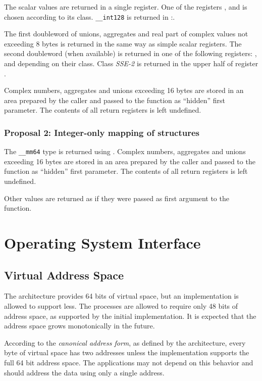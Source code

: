 The scalar values are returned in a single register. One of the
registers \RAX,  and  is chosen according to its
class.  \verb|__int128| is returned in \RDX:\RAX.

The first doubleword of unions, aggregates and real part of complex values
not exceeding 8 bytes is returned in the same way as simple scalar
registers.  The second doubleword (when available) is returned in one of
the following registers: \RAX,  and  depending on
their class.  Class \emph{SSE-2} is returned in the upper half of
register .

Complex numbers, aggregates and unions exceeding 16 bytes are stored
in an area prepared by the caller and passed to the function as
``hidden'' first parameter.  The contents of all return registers is
left undefined.

\subsubsection {Proposal 2: Integer-only mapping of structures}

The \verb|__mm64| type is returned using .  Complex numbers,
aggregates and unions exceeding 16 bytes are stored in an area prepared by the
caller and passed to the function as ``hidden'' first parameter.  The contents
of all return registers is left undefined.

Other values are returned as if they were passed as first argument to
the function.

\section{Operating System Interface}

\subsection{Virtual Address Space}

The \xARCH architecture provides 64 bits of virtual space, but an
implementation is allowed to support less. The processes are allowed
to require only 48 bits of address space, as supported by the initial
implementation.  It is expected that the address space grows
monotonically in the future.

According to the \emph{canonical address form}, as defined by the
\xARCH architecture, every byte of virtual space has two addresses
unless the implementation supports the full 64 bit address space.  The
applications may not depend on this behavior and should address the
data using only a single address.

